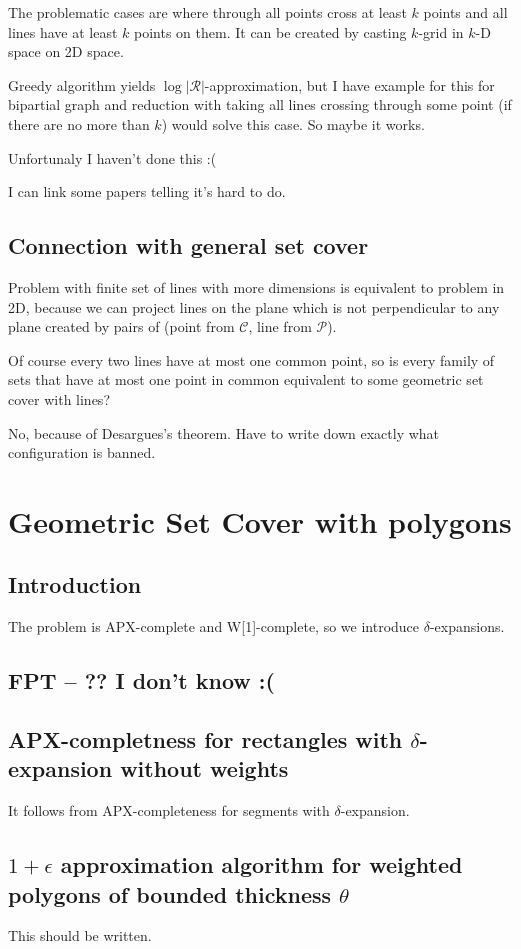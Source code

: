 \documentclass[en]{pracamgr}
\begin{document}
The problematic cases are where through all points
cross at least $k$ points and all lines have at least $k$ points on them.
It can be created by casting $k$-grid in $k$-D space on 2D space.

Greedy algorithm yields $\log |\mathcal{R}|$-approximation,
but I have example for this for bipartial graph and
reduction with taking all lines crossing through some point
(if there are no more than $k$) would solve this case.
So maybe it works.

Unfortunaly I haven't done this :(

I can link some papers telling it's hard to do.

\section{Connection with general set cover}
Problem with finite set of lines with more dimensions
is equivalent
to problem in 2D, because we can project
lines on the plane which is not perpendicular
to any plane created by pairs of
(point from $\mathcal{C}$, line from $\mathcal{P}$).

Of course every two lines have at most one common point,
so is every family of sets that have at most one point
in common equivalent to some geometric set cover with lines?

No, because of Desargues's theorem.
Have to write down exactly what configuration is banned.


\chapter{Geometric Set Cover with polygons}
\section{Introduction}
The problem is APX-complete and W[1]-complete,
so we introduce $\delta$-expansions.

\section{FPT -- ?? I don't know :(}

\section{APX-completness for rectangles with $\delta$-expansion without weights}
It follows from APX-completeness for segments with $\delta$-expansion.
\section{$1+\epsilon$ approximation algorithm for weighted polygons of bounded thickness $\theta$}
This should be written.
\end{document}

